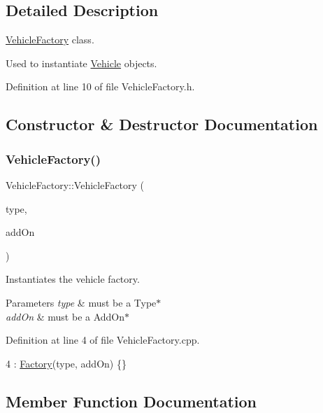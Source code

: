\subsection{Detailed Description}
\hyperlink{classVehicleFactory}{Vehicle\+Factory} class. 

Used to instantiate \hyperlink{classVehicle}{Vehicle} objects. 

Definition at line 10 of file Vehicle\+Factory.\+h.



\subsection{Constructor \& Destructor Documentation}
\mbox{\label{classVehicleFactory_a9bc9faf52aef1ad02193b3640b661f59}} 
\subsubsection{\texorpdfstring{Vehicle\+Factory()}{VehicleFactory()}}
{\footnotesize\ttfamily Vehicle\+Factory\+::\+Vehicle\+Factory (\begin{DoxyParamCaption}\item[{\hyperlink{classType}{Type} $\ast$}]{type,  }\item[{\hyperlink{classAddOn}{Add\+On} $\ast$}]{add\+On }\end{DoxyParamCaption})}



Instantiates the vehicle factory. 


\begin{DoxyParams}{Parameters}
{\em type} & must be a Type$\ast$ \\
\hline
{\em add\+On} & must be a Add\+On$\ast$ \\
\hline
\end{DoxyParams}


Definition at line 4 of file Vehicle\+Factory.\+cpp.


\begin{DoxyCode}
4 : \hyperlink{classFactory_aca946f8877efb5b5bae700f74537d99d}{Factory}(type, addOn) \{\}
\end{DoxyCode}


\subsection{Member Function Documentation}
\mbox{\label{classVehicleFactory_a6d874e37b573b491a49e303209ac42cd}} 
